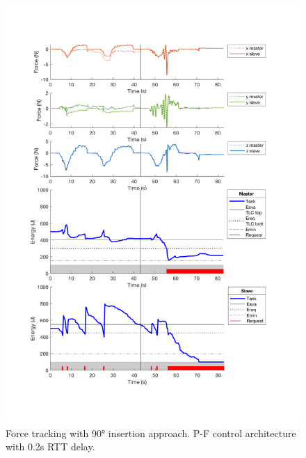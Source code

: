 \begin{center}
	\begin{figure}
		\includegraphics[width=\textwidth, keepaspectratio]{plots/pf90Delay/Force.pdf}
		\caption{Force tracking with 90° insertion approach. P-F control architecture with 0.2s RTT delay.}
		\label{graph:pf90Delay/Force}
	\end{figure}
\end{center}
\newpage
